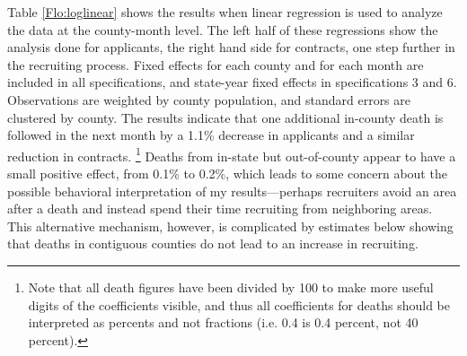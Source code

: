 \documentclass[12pt] {article}
\begin{document}

\begin{table}
\caption{}
\label{Flo:loglinear}
\scalebox{0.9}{

}
\end{table}


Table \ref{Flo:loglinear}
shows the results when linear regression is used to analyze the data
at the county-month level. The left half of these regressions show the analysis done for applicants, the right hand side for contracts, one step further in the recruiting
process. %
Fixed effects for each county and for each month are included in all specifications, and state-year fixed effects  in specifications 3 and 6.
Observations are weighted by county population, and standard errors
are clustered by county. The results indicate that one additional
in-county death is followed in the next month by a 1.1\%
decrease in applicants and a similar reduction in contracts.
\footnote{Note that all death figures have been divided by 100 to make more
useful digits of the coefficients visible, and thus all coefficients
for deaths should be interpreted as percents and not fractions (i.e.
0.4 is 0.4 percent, not 40 percent).} Deaths from in-state but out-of-county
appear to have a small positive effect, from 0.1\% to 0.2\%, which leads to some concern about the possible behavioral interpretation of my results---perhaps recruiters avoid an area after a death and instead spend their time recruiting from neighboring areas. This alternative mechanism, however, is complicated by estimates below showing that deaths in contiguous counties do not lead to an increase in recruiting. 
\end{document}
